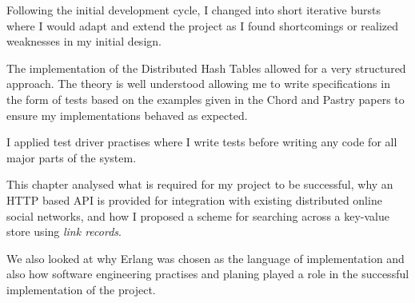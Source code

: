 Following the initial development cycle, I changed into short iterative bursts where I would adapt and extend the project as I found shortcomings or realized weaknesses in my initial design.

The implementation of the Distributed Hash Tables allowed for a very structured approach. The theory is well understood allowing me to write specifications in the form of tests based on the examples given in the Chord \cite{chord} and Pastry \cite{pastry} papers to ensure my implementations behaved as expected.

I applied test driver practises where I write tests before writing any code for all major parts of the system.

This chapter analysed what is required for my project to be successful, why an HTTP based API is provided for integration with existing distributed online social networks, and how I proposed a scheme for searching across a key-value store using \emph{link records}.

We also looked at why Erlang was chosen as the language of implementation and also how software engineering practises and planing played a role in the successful implementation of the project.
